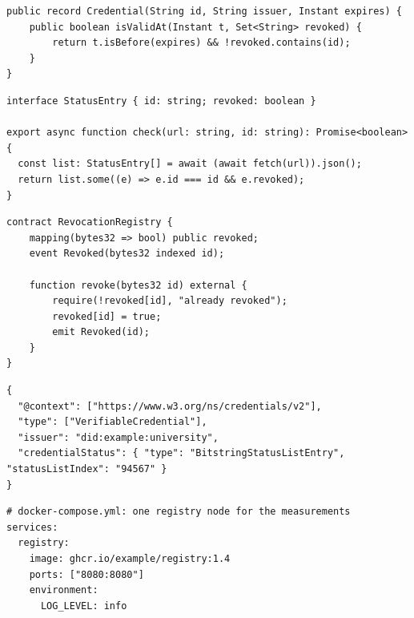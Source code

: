 \begin{listing}[!ht]
\begin{verbatim}
public record Credential(String id, String issuer, Instant expires) {
    public boolean isValidAt(Instant t, Set<String> revoked) {
        return t.isBefore(expires) && !revoked.contains(id);
    }
}
\end{verbatim}
\caption{Java.}\label{lst:latex:java}
\end{listing}

\begin{listing}[!ht]
\begin{verbatim}
interface StatusEntry { id: string; revoked: boolean }

export async function check(url: string, id: string): Promise<boolean> {
  const list: StatusEntry[] = await (await fetch(url)).json();
  return list.some((e) => e.id === id && e.revoked);
}
\end{verbatim}
\caption{TypeScript.}\label{lst:latex:ts}
\end{listing}

\begin{listing}[!ht]
\begin{verbatim}
contract RevocationRegistry {
    mapping(bytes32 => bool) public revoked;
    event Revoked(bytes32 indexed id);

    function revoke(bytes32 id) external {
        require(!revoked[id], "already revoked");
        revoked[id] = true;
        emit Revoked(id);
    }
}
\end{verbatim}
\caption{Solidity.}\label{lst:latex:solidity}
\end{listing}

\FloatBarrier
\begin{listing}[!ht]
\begin{verbatim}
{
  "@context": ["https://www.w3.org/ns/credentials/v2"],
  "type": ["VerifiableCredential"],
  "issuer": "did:example:university",
  "credentialStatus": { "type": "BitstringStatusListEntry", "statusListIndex": "94567" }
}
\end{verbatim}
\caption{JSON (a verifiable credential).}\label{lst:latex:json}
\end{listing}

\begin{listing}[!ht]
\begin{verbatim}
# docker-compose.yml: one registry node for the measurements
services:
  registry:
    image: ghcr.io/example/registry:1.4
    ports: ["8080:8080"]
    environment:
      LOG_LEVEL: info
\end{verbatim}
\caption{YAML.}\label{lst:latex:yaml}
\end{listing}

